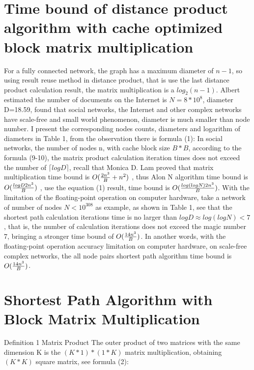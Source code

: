 \documentclass[review]{cvpr}
\begin{document}

\section{Time bound of distance product algorithm with cache optimized block matrix multiplication}
For a fully connected network, the graph has a maximum diameter of $n-1$, so using result reuse method in distance product, that is use the last distance product calculation result, the matrix multiplication is a $log_2(n-1)$.
Albert ~\cite{albert1999diameter} estimated the number of documents on the Internet is $N=8*10^8$, diameter D=18.59, found that social networks, the Internet and other complex networks have scale-free and small world phenomenon, diameter is much smaller than node number.
I present the corresponding nodes counts, diameters and logarithm of diameters in Table 1, from the observation there is formula (1):
In social networks, the number of nodes n, with cache block size $B*B$, according to the formula (9-10), the matrix product calculation iteration times does not exceed the number of $\lceil{logD}\rceil$, recall that Monica D. Lam proved that matrix multiplication time bound is \(O({2n^3 \over B}+{n^2})\) ,
thus Alon N algorithm time bound is \(O({logD 2n^3 \over B})\) , use the equation (1) result, time bound is \(O({ log(logN) 2n^3 \over B})\). With the limitation of the floating-point operation on computer hardware, take a network of number of nodes $N<10^{308}$ as example,
as shown in Table 1, see that the shortest path calculation iterations time is no larger than $logD \approx {log(logN)}<7$, that is, the number of calculation iterations does not exceed the magic number 7, bringing a stronger time bound of \(O({14n^3 \over B})\).
In another words, with the floating-point operation accuracy limitation on computer hardware, on scale-free complex networks, the all node pairs shortest path algorithm time bound is \(O({14n^3 \over B})\).




\section{Shortest Path Algorithm with Block Matrix Multiplication}
Definition 1 Matrix Product The outer product of two matrices with the same dimension K is the $(K*1)*(1*K)$ matrix multiplication, obtaining $(K*K)$ square matrix, see formula (2):
\end{document}
